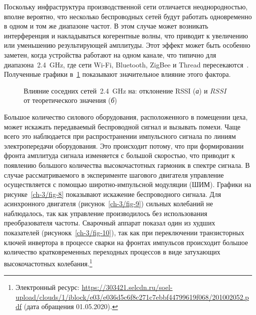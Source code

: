 Поскольку инфраструктура производственной сети отличается неоднородностью, вполне вероятно, что несколько беспроводных сетей будут работать одновременно в одном и том же диапазоне частот. В этом случае может возникать интерференция и накладываться когерентные волны, что приводит к увеличению или уменьшению результирующей амплитуды. Этот эффект может быть особенно заметен, когда устройства работают на одном канале, что типично для диапазона~\SI{2,4}{\giga \hertz}, где сети Wi-Fi, Bluetooth, ZigBee и Thread пересекаются~\cite{016461}. Полученные графики в~\cref{ch-3/fig-7} показывают значительное влияние этого фактора.

\begin{figure} [htb]
	\caption[Влияние соседних сетей~\SI{2,4}{\giga \hertz} на: отклонение RSSI и $RSSI$ от теоретического значения]
	{Влияние соседних сетей~\SI{2,4}{\giga \hertz} на: отклонение RSSI (\textit{а}) и $RSSI$ от теоретического значения (\textit{б})}
	\label{ch-3/fig-7}
\end{figure}

Большое количество силового оборудования, расположенного в помещении цеха, может искажать передаваемый беспроводной сигнал и вызывать помехи. Чаще всего это наблюдается при распространении импульсного сигнала по линиям электропередачи оборудования. Это происходит потому, что при формировании фронта амплитуда сигнала изменяется с большой скоростью, что приводит к появлению большого количества высокочастотных гармоник в спектре сигнала. В случае рассматриваемого в эксперименте шагового двигателя управление осуществляется с помощью широтно-импульсной модуляции (ШИМ). Графики на рисунке~\cref{ch-3/fig-8} показывают искажение беспроводного сигнала. Для асинхронного двигателя (рисунок~\cref{ch-3/fig-9}) сильных колебаний не наблюдалось, так как управление производилось без использования преобразователя частоты. Сварочный аппарат показал один из худших показателей (рисунокк~\cref{ch-3/fig-10}), так как при переключении транзисторных ключей инвертора в процессе сварки на фронтах импульсов происходит большое количество кратковременных переходных процессов в виде затухающих высокочастотных колебания.\footnote{Электронный ресурс: {\tiny\url{https://303421.selcdn.ru/soel-upload/clouds/1/iblock/e03/e036d5c6f8c271c7ebbf44799619f068/201002052.pdf}} (дата обращения 01.05.2020).}

